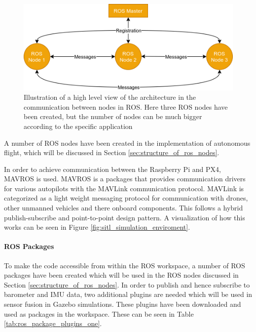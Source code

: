 \documentclass[../Head/report.tex]{subfiles}
\begin{document}
\begin{figure}[H]
    \centering
    \includegraphics[width=0.75\linewidth]{../Figures/ros.png}
    \caption{Illustration of a high level view of the architecture in the communication between nodes in ROS. Here three ROS nodes have been created, but the number of nodes can be much bigger according to the specific application}
    \label{fig:ros}
\end{figure}

A number of ROS nodes have been created in the implementation of autonomous flight, which will be discussed in Section \ref{sec:structure_of_ros_nodes}.

In order to achieve communication between the Raspberry Pi and PX4, MAVROS is used. MAVROS is a packages that provides communication drivers for various autopilots with the MAVLink communication protocol. MAVLink is categorized as a light weight messaging protocol for communication with drones, other unmanned vehicles and there onboard components. This follows a hybrid publish-subscribe and point-to-point design pattern. A visualization of how this works can be seen in Figure \ref{fig:sitl_simulation_enviroment}. 

\paragraph{ROS Packages}

To make the code accessible from within the ROS workspace, a number of ROS packages have been created which will be used in the ROS nodes discussed in Section \ref{sec:structure_of_ros_nodes}. In order to publish and hence subscribe to barometer and IMU data, two additional plugins are needed which will be used in sensor fusion in Gazebo simulations. These plugins have been downloaded and used as packages in the workspace. These can be seen in Table \ref{tab:ros_package_plugins_one}.

\renewcommand{\arraystretch}{1.5}
\end{document}
